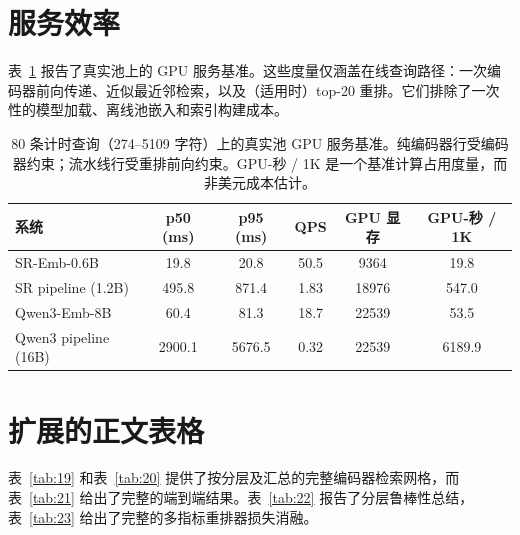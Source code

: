 \documentclass[11pt,UTF8,fontset=fandol]{ctexart}
\begin{document}
\section{服务效率}

表~\ref{tab:18} 报告了真实池上的 GPU 服务基准。这些度量仅涵盖在线查询路径：一次编码器前向传递、近似最近邻检索，以及（适用时）top-20 重排。它们排除了一次性的模型加载、离线池嵌入和索引构建成本。

\begin{table}[H]\centering
\caption{80 条计时查询（274--5109 字符）上的真实池 GPU 服务基准。纯编码器行受编码器约束；流水线行受重排前向约束。GPU-秒 / 1K 是一个基准计算占用度量，而非美元成本估计。}
\begin{tabular}{lccccc}
\toprule
系统 & p50 (ms) & p95 (ms) & QPS & GPU 显存 & GPU-秒 / 1K \\ \midrule
SR-Emb-0.6B & 19.8 & 20.8 & 50.5 & 9364 & 19.8 \\
SR pipeline (1.2B) & 495.8 & 871.4 & 1.83 & 18976 & 547.0 \\
Qwen3-Emb-8B & 60.4 & 81.3 & 18.7 & 22539 & 53.5 \\
Qwen3 pipeline (16B) & 2900.1 & 5676.5 & 0.32 & 22539 & 6189.9 \\
\bottomrule
\end{tabular}
\label{tab:18}
\end{table}

\section{扩展的正文表格}

表~\ref{tab:19} 和表~\ref{tab:20} 提供了按分层及汇总的完整编码器检索网格，而表~\ref{tab:21} 给出了完整的端到端结果。表~\ref{tab:22} 报告了分层鲁棒性总结，表~\ref{tab:23} 给出了完整的多指标重排器损失消融。
\end{document}
